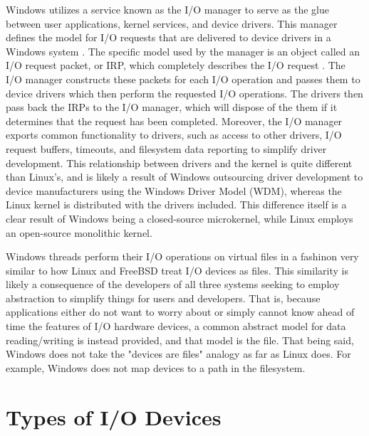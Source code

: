 \documentclass[onecolumn, draftclsnofoot,10pt, compsoc]{IEEEtran}
\begin{document}
Windows utilizes a service known as the I/O manager to serve as the glue between user applications, kernel services, and device drivers. This manager defines the model for I/O requests that are delivered to device drivers in a Windows system \cite{WindowsInternals2}. The specific model used by the manager is an object called an I/O request packet, or IRP, which completely describes the I/O request \cite{WindowsInternals2}. The I/O manager constructs these packets for each I/O operation and passes them to device drivers which then perform the requested I/O operations. The drivers then pass back the IRPs to the I/O manager, which will dispose of the them if it determines that the request has been completed. Moreover, the I/O manager exports common functionality to drivers, such as access to other drivers, I/O request buffers, timeouts, and filesystem data reporting to simplify driver development. This relationship between drivers and the kernel is quite different than Linux's, and is likely a result of Windows outsourcing driver development to device manufacturers using the Windows Driver Model (WDM), whereas the Linux kernel is distributed with the drivers included. This difference itself is a clear result of Windows being a closed-source microkernel, while Linux employs an open-source monolithic kernel. 

Windows threads perform their I/O operations on virtual files in a fashinon very similar to how Linux and FreeBSD treat I/O devices as files. This similarity is likely a consequence of the developers of all three systems seeking to employ abstraction to simplify things for users and developers. That is, because applications either do not want to worry about or simply cannot know ahead of time the features of I/O hardware devices, a common abstract model for data reading/writing is instead provided, and that model is the file. That being said, Windows does not take the "devices are files" analogy as far as Linux does. For example, Windows does not map devices to a path in the filesystem.
\section{Types of I/O Devices}
\newpage


\end{document}
